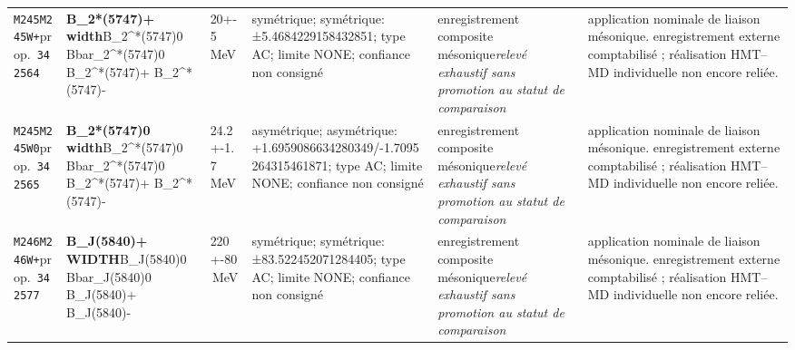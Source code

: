\begin{landscape}
\begin{longtable}{L{1.85cm}L{4.45cm}L{2.35cm}L{4.05cm}L{3.35cm}L{7.15cm}}
\texttt{M245}\newline \texttt{M245W+}\newline prop.\ \texttt{342564} & \textbf{B\_\allowbreak{}2*(5747)+ width}\newline B\_\allowbreak{}2\textasciicircum{}*(5747)0 \textbar{}\allowbreak{} Bbar\_\allowbreak{}2\textasciicircum{}*(5747)0 \textbar{}\allowbreak{} B\_\allowbreak{}2\textasciicircum{}*(5747)+ \textbar{}\allowbreak{} B\_\allowbreak{}2\textasciicircum{}*(5747)- & 20+-5\,MeV & symétrique; symétrique: ±5.4684229158432851; type AC; limite NONE; confiance non consigné & enregistrement composite mésonique\newline \emph{relevé exhaustif sans promotion au statut de comparaison} & application nominale de liaison mésonique. enregistrement externe comptabilisé ; réalisation HMT--MD individuelle non encore reliée. \\
\texttt{M245}\newline \texttt{M245W0}\newline prop.\ \texttt{342565} & \textbf{B\_\allowbreak{}2*(5747)0 width}\newline B\_\allowbreak{}2\textasciicircum{}*(5747)0 \textbar{}\allowbreak{} Bbar\_\allowbreak{}2\textasciicircum{}*(5747)0 \textbar{}\allowbreak{} B\_\allowbreak{}2\textasciicircum{}*(5747)+ \textbar{}\allowbreak{} B\_\allowbreak{}2\textasciicircum{}*(5747)- & 24.2+-1.7\,MeV & asymétrique; asymétrique: +1.6959086634280349/-1.7095264315461871; type AC; limite NONE; confiance non consigné & enregistrement composite mésonique\newline \emph{relevé exhaustif sans promotion au statut de comparaison} & application nominale de liaison mésonique. enregistrement externe comptabilisé ; réalisation HMT--MD individuelle non encore reliée. \\
\texttt{M246}\newline \texttt{M246W+}\newline prop.\ \texttt{342577} & \textbf{B\_\allowbreak{}J(5840)+ WIDTH}\newline B\_\allowbreak{}J(5840)0 \textbar{}\allowbreak{} Bbar\_\allowbreak{}J(5840)0 \textbar{}\allowbreak{} B\_\allowbreak{}J(5840)+ \textbar{}\allowbreak{} B\_\allowbreak{}J(5840)- & 220+-80\,MeV & symétrique; symétrique: ±83.522452071284405; type AC; limite NONE; confiance non consigné & enregistrement composite mésonique\newline \emph{relevé exhaustif sans promotion au statut de comparaison} & application nominale de liaison mésonique. enregistrement externe comptabilisé ; réalisation HMT--MD individuelle non encore reliée. \\

\end{longtable}
\end{landscape}
